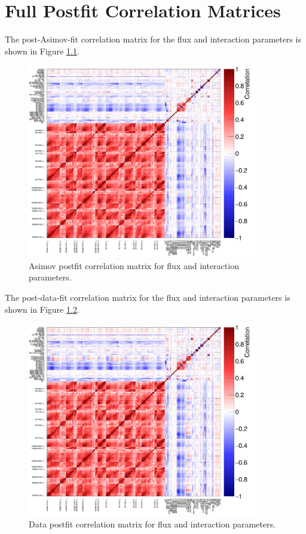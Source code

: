 \chapter{Full Postfit Correlation Matrices}\label{app:postfitcorrs}

The post-Asimov-fit correlation matrix for the flux and interaction parameters is shown in Figure \ref{fig:asmvpostfitcovapp}.

\begin{figure}[!htbp]
\centering
\includegraphics*[width=0.9\textwidth,clip]{figs/Mach3AsmvCorr}
\caption{Asimov postfit correlation matrix for flux and interaction parameters.}\label{fig:asmvpostfitcovapp}
\end{figure}

The post-data-fit correlation matrix for the flux and interaction parameters is shown in Figure \ref{fig:datpostfitcovapp}.

\begin{figure}[!htbp]
\centering
\includegraphics*[width=0.9\textwidth,clip]{figs/MaCh3DataCorr}
\caption{Data postfit correlation matrix for flux and interaction parameters.}\label{fig:datpostfitcovapp}
\end{figure}

\newpage